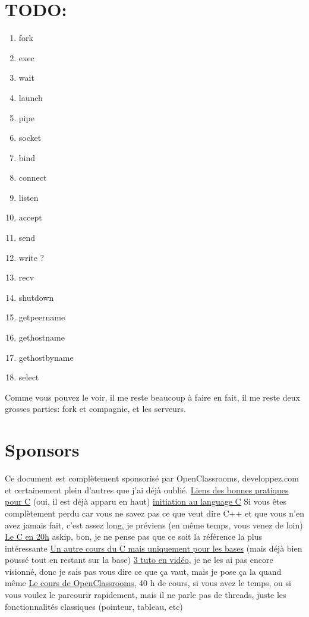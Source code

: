 \documentclass[a4paper]{article}
\begin{document}
\section{TODO:}
\begin{enumerate}
  \item fork
  \item exec
  \item wait
  \item launch
  \item pipe
  \item socket
  \item bind
  \item connect
  \item listen
  \item accept
  \item send
  \item write ?
  \item recv
  \item shutdown
  \item getpeername
  \item gethostname
  \item gethostbyname
  \item select
\end{enumerate}
Comme vous pouvez le voir, il me reste beaucoup à faire en fait, il me reste deux grosses parties: fork et compagnie, et les serveurs.

\section{Sponsors}
Ce document est complètement sponsorisé par OpenClassrooms, developpez.com et certainement plein d'autres que j'ai déjà oublié.\newline
\href{http://emmanuel-delahaye.developpez.com/tutoriels/c/bonnes-pratiques-codage-c/#LI-A}{Liens des bonnes pratiques pour C} (oui, il est déjà apparu en haut)\newline
\href{http://melem.developpez.com/tutoriels/langage-c/initiation-langage-c/}{initiation au language C} Si vous êtes complètement perdu car vous ne savez pas ce que veut dire C++ et que vous n'en avez jamais fait, c'est assez long, je préviens (en même temps, vous venez de loin)\newline
\href{https://c.developpez.com/cours/20-heures/}{Le C en 20h} askip, bon, je ne pense pas que ce soit la référence la plus intéressante\newline
\href{https://c.developpez.com/cours/poly-c/?page=page_1}{Un autre cours du C mais uniquement pour les bases} (mais déjà bien poussé tout en restant sur la base)\newline
\href{https://fr.tuto.com/langage-c/}{3 tuto en vidéo}, je ne les ai pas encore visionné, donc je sais pas vous dire ce que ça vaut, mais je pose ça la quand même\newline
\href{https://openclassrooms.com/courses/apprenez-a-programmer-en-c}{Le cours de OpenClassrooms}, 40 h de cours, si vous avez le temps, ou si vous voulez le parcourir rapidement, mais il ne parle pas de threads, juste les fonctionnalités classiques (pointeur, tableau, etc)
\end{document}
